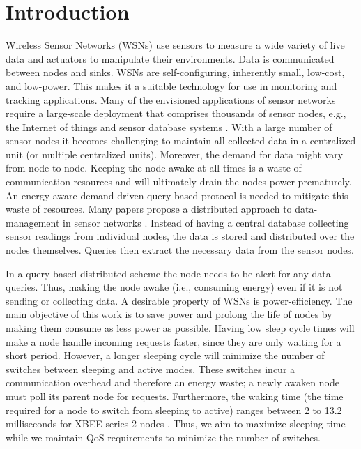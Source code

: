 \section{Introduction}\label{sec:Intro}

Wireless Sensor Networks (WSNs) use sensors to measure a wide variety of live data and actuators to manipulate their environments. Data is communicated between nodes and sinks. WSNs are self-configuring, inherently small, low-cost, and low-power. This makes it a suitable technology for use in monitoring and tracking applications. Many of the envisioned applications of sensor networks require a large-scale deployment that comprises thousands of sensor nodes, e.g., the Internet of things \cite{22} and sensor database systems \cite{2}. With a large number of sensor nodes it becomes challenging to maintain all collected data in a centralized unit (or multiple centralized units). Moreover, the demand for data might vary from node to node. Keeping the node awake at all times is a waste of communication resources and will ultimately drain the nodes power prematurely. An energy-aware demand-driven query-based protocol is needed to mitigate this waste of resources. Many papers propose a distributed approach to data-management in sensor networks \cite{2,4.11,23}. Instead of having a central database collecting sensor readings from individual nodes, the data is stored and distributed over the nodes themselves. Queries then extract the necessary data from the sensor nodes. 

In a query-based distributed scheme the node needs to be alert for any data queries. Thus, making the node awake (i.e., consuming energy) even if it is not sending or collecting data. A desirable property of WSNs is power-efficiency. The main objective of this work is to save power and prolong the life of nodes by making them consume as less power as possible. Having low sleep cycle times will make a node handle incoming requests faster, since they are only waiting for a short period. However, a longer sleeping cycle will minimize the number of switches between sleeping and active modes. These switches incur a communication overhead and therefore an energy waste; a newly awaken node must poll its parent node for requests. Furthermore, the waking time (the time required for a node to switch from sleeping to active) ranges between 2 to 13.2 milliseconds for XBEE series 2 nodes \cite{19}. Thus, we aim to maximize sleeping time while we maintain QoS requirements to minimize the number of switches.

